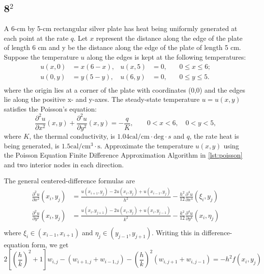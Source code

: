 \documentclass[12pt]{article}
\begin{document}
\subsection{8$^2$}
A 6-cm by 5-cm rectangular silver plate has heat being uniformly
generated at each point at the rate
$q$. Let $x$ represent the
distance along the edge of the plate of length 6 cm and y be the
distance along the edge of the plate of length 5 cm. Suppose the
temperature $u$ along the edges is kept at the following temperatures:
\begin{equation*}
  \begin{aligned}
    u(x,0)&=x(6-x), &u(x,5)&=0,\quad &0\leq x\leq 6; \\
    u(0,y)&=y(5-y), &u(6,y)&=0,\quad &0\leq y \leq 5. \\
  \end{aligned}
\end{equation*}
where the origin lies at a corner of the plate with coordinates (0,0)
and the edges lie along the positive x- and y-axes. The steady-state
temperature $u=u(x,y)$ satisfies the Poisson's equation:
\begin{equation*}
  \frac{\partial^2u}{\partial x^2}(x,y) +
  \frac{\partial^2u}{\partial y^2}(x,y) = -\frac{q}{K}, \qquad
  0<x<6,\quad 0<y<5,
\end{equation*}
where $K$, the thermal conductivity, is $1.04 \text{
  cal}/\text{cm}\cdot \text{deg} \cdot s$ and $q$, the rate heat is
being generated, is $1.5\text{
  cal}/\text{cm}^3\cdot\text{s}$. Approximate the temperature $u(x,y)$
using the Poisson Equation Finite Difference Approximation Algorithm
in \cref{lst:poisson} and two interior nodes in each direction.

\hfill

The general centered-difference formulas are
\begin{equation}
  \label{eq:8_gencentdiff}
  \begin{aligned}
    \frac{\partial^2u}{\partial x^2}(x_i,y_j) &=
    \frac{u(x_{i+1},y_{j})-2u(x_{i},y_{j}) + u(x_{i-1},y_{j})}{h^2} -
    \frac{h^2}{12}\frac{\partial^4u}{\partial x^4}(\xi_i,y_j) \\
    \frac{\partial^2u}{\partial y^2}(x_i,y_j) &=
    \frac{u(x_{i},y_{j+1})-2u(x_{i},y_{j}) + u(x_{i},y_{j-1})}{k^2} -
    \frac{k^2}{12}\frac{\partial^4u}{\partial y^4}(x_i,\eta_j) \\
  \end{aligned}
\end{equation}
where $\xi_i \in (x_{i-1},x_{i+1})$ and $\eta_j \in
(y_{j-1},y_{j+1})$.
Writing this in difference-equation form, we get
\begin{equation}
  \label{eq:findiffcentdiff}
  2\left[\left(\frac{h}{k}\right)^2+1\right]w_{i,j}-(w_{i+1,j}+w_{i-1,j})
  - \left(\frac{h}{k}\right)^2(w_{i,j+1}+w_{i,j-1})=-h^2f(x_i,y_j)
\end{equation}
\hfill
\end{document}
